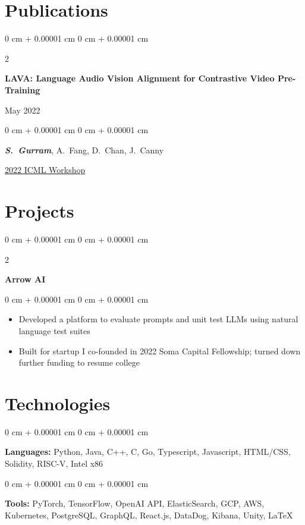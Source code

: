 \documentclass[10pt, letterpaper]{article}
\newenvironment{highlights}{
    \begin{itemize}[
        topsep=0.10 cm,
        parsep=0.10 cm,
        partopsep=0pt,
        itemsep=0pt,
        leftmargin=0 cm + 10pt
    ]
}{
    \end{itemize}
} %
\newenvironment{onecolentry}{
    \begin{adjustwidth}{
        0 cm + 0.00001 cm
    }{
        0 cm + 0.00001 cm
    }
}{
    \end{adjustwidth}
} %
\newenvironment{twocolentry}[2][]{
    \onecolentry
    \def\secondColumn{#2}
    \setcolumnwidth{\fill, 4.5 cm}
    \begin{paracol}{2}
}{
    \switchcolumn \raggedleft \secondColumn
    \end{paracol}
    \endonecolentry
} %
\begin{document}
    
    \section{Publications}
        \begin{samepage}
            \begin{twocolentry}{
                May 2022
            }
                \textbf{LAVA: Language Audio Vision Alignment for Contrastive Video Pre-Training}
            \end{twocolentry}

            \vspace{0.10 cm}
            
            \begin{onecolentry}
                \mbox{\textbf{\textit{S. Gurram}}}, \mbox{A. Fang}, \mbox{D. Chan}, \mbox{J. Canny}
                \vspace{0.10 cm}
                
        \href{https://arxiv.org/abs/2207.08024}{2022 ICML Workshop}
        \end{onecolentry}
        \end{samepage}

    
    \section{Projects}



        
        \begin{twocolentry}{
        }
            \textbf{Arrow AI}\end{twocolentry}

        \vspace{0.10 cm}
        \begin{onecolentry}
            \begin{highlights}
                \item Developed a platform to evaluate prompts and unit test LLMs using natural language test suites
                \item Built for startup I co-founded in 2022 Soma Capital Fellowship; turned down further funding to resume college
            \end{highlights}
        \end{onecolentry}



    
    \section{Technologies}



        
        \begin{onecolentry}
            \textbf{Languages:} Python, Java, C++, C, Go, Typescript, Javascript, HTML/CSS, Solidity, RISC-V, Intel x86
        \end{onecolentry}

        \begin{onecolentry}
            \textbf{Tools:} PyTorch, TensorFlow, OpenAI API, ElasticSearch, GCP, AWS, Kubernetes, PostgreSQL, GraphQL, React.js, DataDog, Kibana, Unity, LaTeX
        \end{onecolentry}


    
\end{document}
